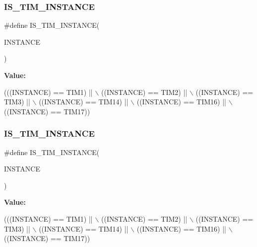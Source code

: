 \subsubsection{\texorpdfstring{I\+S\+\_\+\+T\+I\+M\+\_\+\+I\+N\+S\+T\+A\+N\+CE}{IS\_TIM\_INSTANCE}\hspace{0.1cm}{\footnotesize\ttfamily [11/16]}}
{\footnotesize\ttfamily \#define I\+S\+\_\+\+T\+I\+M\+\_\+\+I\+N\+S\+T\+A\+N\+CE(\begin{DoxyParamCaption}\item[{}]{I\+N\+S\+T\+A\+N\+CE }\end{DoxyParamCaption})}

{\bfseries Value\+:}
\begin{DoxyCode}
(((INSTANCE) == TIM1)    || \(\backslash\)
   ((INSTANCE) == TIM2)    || \(\backslash\)
   ((INSTANCE) == TIM3)    || \(\backslash\)
   ((INSTANCE) == TIM14)   || \(\backslash\)
   ((INSTANCE) == TIM16)   || \(\backslash\)
   ((INSTANCE) == TIM17))
\end{DoxyCode}
\mbox{\label{group___exported__macro_gaba506eb03409b21388d7c5a6401a4f98}} 
\subsubsection{\texorpdfstring{I\+S\+\_\+\+T\+I\+M\+\_\+\+I\+N\+S\+T\+A\+N\+CE}{IS\_TIM\_INSTANCE}\hspace{0.1cm}{\footnotesize\ttfamily [12/16]}}
{\footnotesize\ttfamily \#define I\+S\+\_\+\+T\+I\+M\+\_\+\+I\+N\+S\+T\+A\+N\+CE(\begin{DoxyParamCaption}\item[{}]{I\+N\+S\+T\+A\+N\+CE }\end{DoxyParamCaption})}

{\bfseries Value\+:}
\begin{DoxyCode}
(((INSTANCE) == TIM1)    || \(\backslash\)
   ((INSTANCE) == TIM2)    || \(\backslash\)
   ((INSTANCE) == TIM3)    || \(\backslash\)
   ((INSTANCE) == TIM14)   || \(\backslash\)
   ((INSTANCE) == TIM16)   || \(\backslash\)
   ((INSTANCE) == TIM17))
\end{DoxyCode}
\mbox{\label{group___exported__macro_gaba506eb03409b21388d7c5a6401a4f98}} 
